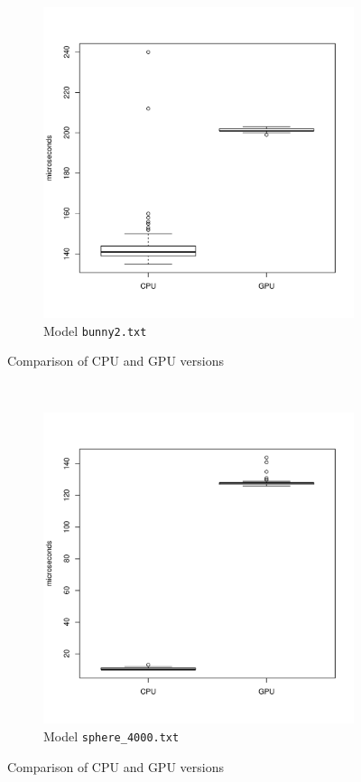 	\begin{figure}
		\ContinuedFloat
		\center
		\begin{subfigure}[b]{0.45\textwidth}
			\includegraphics[width=\textwidth]{results/bunny}
			\caption{Model \texttt{bunny2.txt}}
		\end{subfigure}
		\caption{Comparison of CPU and GPU versions}
		~%
		\begin{subfigure}[b]{0.45\textwidth}
			\includegraphics[width=\textwidth]{results/sphere_4000}
			\caption{Model \texttt{sphere\_4000.txt}}
		\end{subfigure}
		\caption[]{Comparison of CPU and GPU versions}
		\label{fig:results}
	\end{figure}
